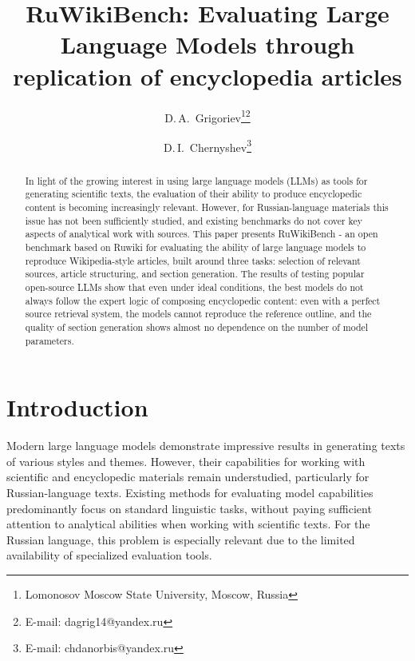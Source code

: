 \documentclass{superfri}
\begin{document}
\raggedbottom

\author{D.\,A.~Grigoriev\footnote{\label{msu}Lomonosov Moscow State University, Moscow, Russia}\footnote{E-mail: dagrig14@yandex.ru}
\and D.\,I.~Chernyshev\footnote{E-mail: chdanorbis@yandex.ru}}

\title{RuWikiBench: Evaluating Large Language Models through replication of encyclopedia articles}

\maketitle{}

\begin{abstract}
In light of the growing interest in using large language models (LLMs) as tools for generating scientific texts,
the evaluation of their ability to produce encyclopedic content is becoming increasingly relevant.
However, for Russian-language materials this issue has not been sufficiently studied, and existing benchmarks do not cover key aspects of analytical work with sources.
This paper presents RuWikiBench - an open benchmark based on Ruwiki for evaluating the ability of large language models to reproduce Wikipedia-style articles,
built around three tasks:
selection of relevant sources, article structuring, and section generation.
The results of testing popular open-source LLMs show that even under ideal conditions, the best models do not always follow the expert logic of composing encyclopedic content:
even with a perfect source retrieval system, the models cannot reproduce the reference outline, and the quality of section generation shows almost no dependence on the number of model parameters.

\end{abstract}

\section*{Introduction}
Modern large language models demonstrate impressive results in generating texts of various styles and themes. 
However, their capabilities for working with scientific and encyclopedic materials remain understudied, particularly for Russian-language texts. 
Existing methods for evaluating model capabilities predominantly focus on standard linguistic tasks, without paying sufficient attention to analytical abilities when working with scientific texts. 
For the Russian language, this problem is especially relevant due to the limited availability of specialized evaluation tools.
\end{document}
